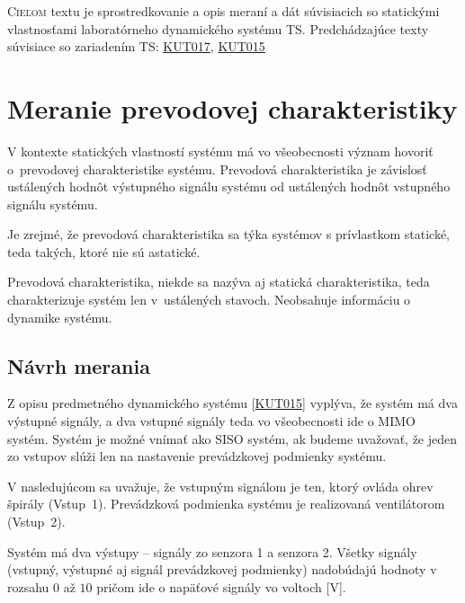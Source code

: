 \documentclass[a4paper, 10pt, ]{article}
\begin{document}
\lstset{style=mystyle}










\noindent
\lettrine[lines=1, nindent=1pt, loversize=0.0]{C}{ieľom} 
textu je sprostredkovanie a opis meraní a dát súvisiacich so statickými vlastnosťami laboratórneho dynamického systému TS. Predchádzajúce texty súvisiace so zariadením TS: \href{run:../../KUT017/TeX/KUT017.pdf}{\textsf{KUT017}}, \href{run:../../KUT015/TeX/KUT015.pdf}{\textsf{KUT015}} 







\section{Meranie prevodovej charakteristiky}

V kontexte statických vlastností systému má vo všeobecnosti význam hovoriť o~prevodovej charakteristike systému. Prevodová charakteristika je závislosť ustálených hodnôt výstupného signálu systému od ustálených hodnôt vstupného signálu systému.

Je zrejmé, že prevodová charakteristika sa týka systémov s prívlastkom statické, teda takých, ktoré nie sú astatické.

Prevodová charakteristika, niekde sa nazýva aj statická charakteristika, teda charakterizuje systém len v~ustálených stavoch. Neobsahuje informáciu o dynamike systému.



\subsection{Návrh merania}

Z opisu predmetného dynamického systému [\href{run:../../KUT015/TeX/KUT015.pdf}{\textsf{KUT015}}] vyplýva, že systém má dva výstupné signály, a dva vstupné signály teda vo všeobecnosti ide o MIMO systém. Systém je možné vnímať ako SISO systém, ak budeme uvažovať, že jeden zo vstupov slúži len na nastavenie prevádzkovej podmienky systému.

V nasledujúcom sa uvažuje, že vstupným signálom je ten, ktorý ovláda ohrev špirály (Vstup~1). Prevádzková podmienka systému je realizovaná ventilátorom (Vstup~2).

Systém má dva výstupy – signály zo senzora 1 a senzora 2. Všetky signály (vstupný, výstupné aj signál prevádzkovej podmienky) nadobúdajú hodnoty v rozsahu $0$ až $10$ pričom ide o napäťové signály vo voltoch [V].
\end{document}
